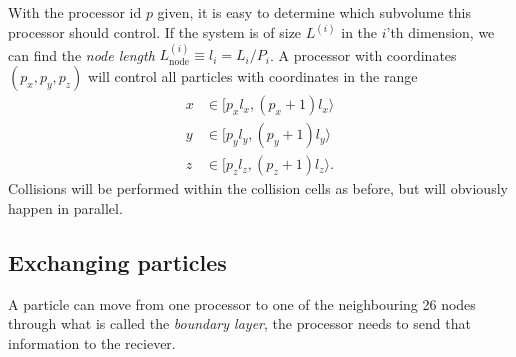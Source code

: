 With the processor id $p$ given, it is easy to determine which subvolume this processor should control. If the system is of size $L^{(i)}$ in the $i$'th dimension, we can find the \textit{node length} $L_{\text{node}}^{(i)} \equiv l_i = L_i/P_i$. A processor with coordinates $(p_x, p_y, p_z)$ will control all particles with coordinates in the range
\begin{align}
	\nonumber
	x&\in[p_xl_x, (p_x+1)l_x\rangle\\
	\nonumber
	y&\in[p_yl_y, (p_y+1)l_y\rangle\\
	z&\in[p_zl_z, (p_z+1)l_z\rangle.
\end{align}
Collisions will be performed within the collision cells as before, but will obviously happen in parallel. 
\subsection{Exchanging particles}
A particle can move from one processor to one of the neighbouring 26 nodes through what is called the \textit{boundary layer}, the processor needs to send that information to the reciever. 
